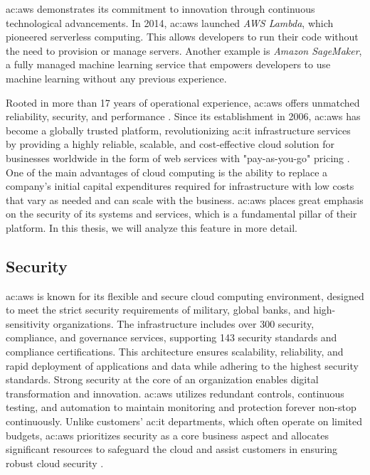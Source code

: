 \gls{ac:aws} demonstrates its commitment to innovation through continuous technological advancements. In 2014, \gls{ac:aws} launched \textit{AWS Lambda}, which pioneered serverless computing. This allows developers to run their code without the need to provision or manage servers. Another example is \textit{Amazon SageMaker}, a fully managed machine learning service that empowers developers to use machine learning without any previous experience.

Rooted in more than 17 years of operational experience, \gls{ac:aws} offers unmatched reliability, security, and performance \cite{WhatIsAWS}. Since its establishment in 2006, \gls{ac:aws} has become a globally trusted platform, revolutionizing \gls{ac:it} infrastructure services by providing a highly reliable, scalable, and cost-effective cloud solution for businesses worldwide in the form of web services with "pay-as-you-go" pricing \cite{AboutAWS}. One of the main advantages of cloud computing is the ability to replace a company's initial capital expenditures required for infrastructure with low costs that vary as needed and can scale with the business. \gls{ac:aws} places great emphasis on the security of its systems and services, which is a fundamental pillar of their platform. In this thesis, we will analyze this feature in more detail.

\subsection{Security}
\gls{ac:aws} is known for its flexible and secure cloud computing environment, designed to meet the strict security requirements of military, global banks, and high-sensitivity organizations. The infrastructure includes over 300 security, compliance, and governance services, supporting 143 security standards and compliance certifications. This architecture ensures scalability, reliability, and rapid deployment of applications and data while adhering to the highest security standards. Strong security at the core of an organization enables digital transformation and innovation. \gls{ac:aws} utilizes redundant controls, continuous testing, and automation to maintain monitoring and protection forever non-stop continuously. Unlike customers' \gls{ac:it} departments, which often operate on limited budgets, \gls{ac:aws} prioritizes security as a core business aspect and allocates significant resources to safeguard the cloud and assist customers in ensuring robust cloud security \cite{AWSCloudComputing}. 

